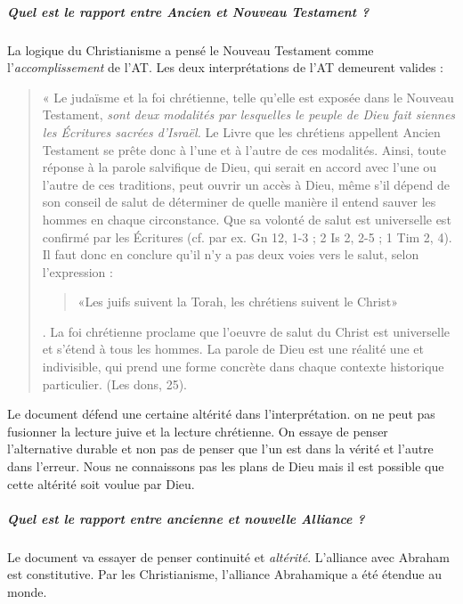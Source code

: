       \subparagraph{Quel est le rapport entre Ancien et Nouveau Testament ?}
      La logique du Christianisme a pensé le Nouveau Testament comme l'\textit{accomplissement} de l'AT. 
      Les deux interprétations de l'AT demeurent valides : 
        \begin{quote}
    «  Le  judaïsme  et  la  foi  chrétienne,  telle  qu’elle  est  exposée  dans  le  Nouveau  Testament,  \textit{sont deux  modalités  par  lesquelles  le  peuple  de  Dieu  fait  siennes  les  Écritures  sacrées  d’Israël.}  Le Livre  que  les  chrétiens  appellent  Ancien  Testament  se  prête  donc  à  l’une  et  à  l’autre  de  ces modalités.  Ainsi,  toute  réponse  à  la  parole  salvifique  de  Dieu,  qui  serait  en  accord  avec  l’une ou  l’autre  de  ces  traditions,  peut  ouvrir  un  accès  à  Dieu,  même  s’il  dépend  de  son  conseil  de salut  de  déterminer  de  quelle  manière  il  entend  sauver  les  hommes  en  chaque  circonstance. Que  sa  volonté  de  salut  est  universelle  est  confirmé  par  les  Écritures  (cf.  par  ex.  Gn  12,  1-3  ; 2 Is  2,  2-5  ;  1  Tim  2,  4).  Il  faut  donc  en  conclure  qu’il  n’y  a  pas  deux  voies  vers  le  salut,  selon l’expression  :  \begin{quote}
        «Les  juifs  suivent  la  Torah,  les  chrétiens  suivent  le  Christ»
    \end{quote}.  La  foi  chrétienne proclame  que  l’oeuvre  de  salut  du  Christ  est  universelle  et  s’étend  à  tous  les  hommes.  La parole  de  Dieu  est  une  réalité  une  et  indivisible,  qui  prend  une  forme  concrète  dans  chaque contexte  historique  particulier. (Les  dons, 25). 
\end{quote} 
    Le document défend une certaine altérité dans l'interprétation. on ne peut pas fusionner la lecture juive et la lecture chrétienne. On essaye de penser l'alternative durable et non pas de penser que l'un est dans la vérité et l'autre dans l'erreur. Nous ne connaissons pas les plans de Dieu mais il est possible que cette altérité soit voulue par Dieu.
    
    
    
      
     \subparagraph{Quel est le rapport entre ancienne et nouvelle Alliance ?}
      Le document va essayer de penser continuité et \textit{altérité}. L'alliance avec Abraham est constitutive. Par les Christianisme, l'alliance Abrahamique a été étendue au monde. 
      
